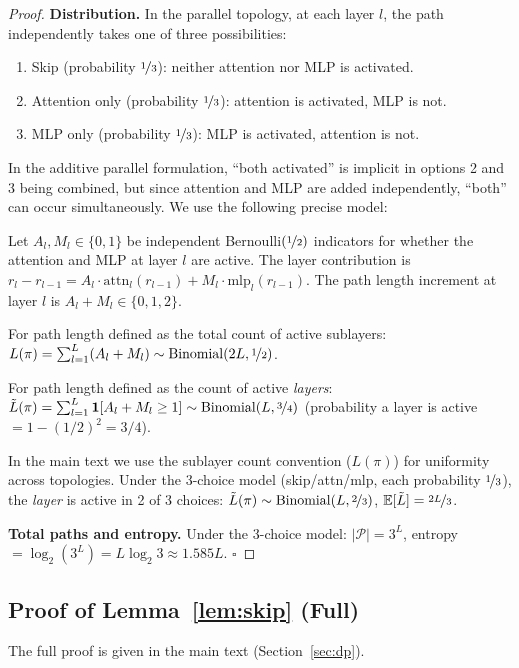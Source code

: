 \documentclass{article}
\newcommand{\E}{\mathbb{E}}
\newcommand{\Pcal}{\mathcal{P}}
\newcommand{\attn}{\mathrm{attn}}
\newcommand{\mlp}{\mathrm{mlp}}
\begin{document}
\begin{proof}
\textbf{Distribution.}
In the parallel topology, at each layer $l$, the path independently takes one of
three possibilities:
\begin{enumerate}
  \item Skip (probability $\nicefrac{1}{3}$): neither attention nor MLP is activated.
  \item Attention only (probability $\nicefrac{1}{3}$): attention is activated, MLP is not.
  \item MLP only (probability $\nicefrac{1}{3}$): MLP is activated, attention is not.
\end{enumerate}
In the additive parallel formulation, ``both activated'' is implicit in options 2 and 3
being combined, but since attention and MLP are added independently, ``both'' can occur
simultaneously.  We use the following precise model:

Let $A_l, M_l \in \{0,1\}$ be independent Bernoulli$(\nicefrac{1}{2})$ indicators for
whether the attention and MLP at layer $l$ are active.  The layer contribution is
$r_l - r_{l-1} = A_l \cdot \attn_l(r_{l-1}) + M_l \cdot \mlp_l(r_{l-1})$.
The path length increment at layer $l$ is $A_l + M_l \in \{0,1,2\}$.

For path length defined as the total count of active sublayers:
$L(\pi) = \sum_{l=1}^{L}(A_l + M_l) \sim \mathrm{Binomial}(2L, \nicefrac{1}{2})$.

For path length defined as the count of active \emph{layers}:
$\tilde{L}(\pi) = \sum_{l=1}^{L} \mathbf{1}[A_l + M_l \geq 1] \sim \mathrm{Binomial}(L, \nicefrac{3}{4})$
(probability a layer is active $= 1 - (1/2)^2 = 3/4$).

In the main text we use the sublayer count convention ($L(\pi)$) for uniformity across topologies.
Under the 3-choice model (skip/attn/mlp, each probability $\nicefrac{1}{3}$),
the \emph{layer} is active in 2 of 3 choices:
$\tilde{L}(\pi) \sim \mathrm{Binomial}(L, \nicefrac{2}{3})$, $\E[\tilde{L}] = \nicefrac{2L}{3}$.

\textbf{Total paths and entropy.}
Under the 3-choice model: $|\Pcal| = 3^L$, entropy $= \log_2(3^L) = L\log_2 3 \approx 1.585L$.
$\square$
\end{proof}

\subsection{Proof of Lemma~\ref{lem:skip} (Full)}

The full proof is given in the main text (Section~\ref{sec:dp}).
\end{document}
